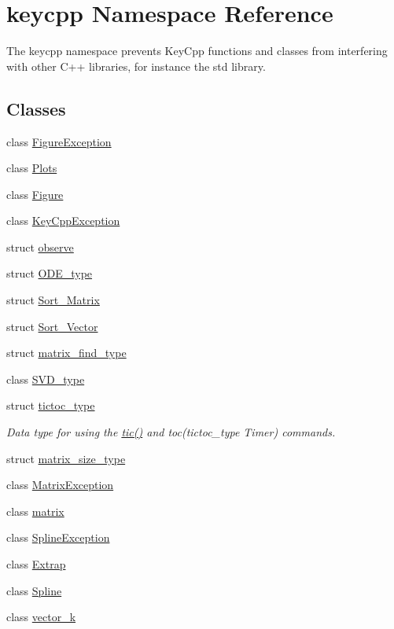 \hypertarget{namespacekeycpp}{\section{keycpp Namespace Reference}
\label{namespacekeycpp}
}


The keycpp namespace prevents Key\-Cpp functions and classes from interfering with other C++ libraries, for instance the std library.  


\subsection*{Classes}
\begin{DoxyCompactItemize}
\item 
class \hyperlink{classkeycpp_1_1_figure_exception}{Figure\-Exception}
\item 
class \hyperlink{classkeycpp_1_1_plots}{Plots}
\item 
class \hyperlink{classkeycpp_1_1_figure}{Figure}
\item 
class \hyperlink{classkeycpp_1_1_key_cpp_exception}{Key\-Cpp\-Exception}
\item 
struct \hyperlink{structkeycpp_1_1observe}{observe}
\item 
struct \hyperlink{structkeycpp_1_1_o_d_e__type}{O\-D\-E\-\_\-type}
\item 
struct \hyperlink{structkeycpp_1_1_sort___matrix}{Sort\-\_\-\-Matrix}
\item 
struct \hyperlink{structkeycpp_1_1_sort___vector}{Sort\-\_\-\-Vector}
\item 
struct \hyperlink{structkeycpp_1_1matrix__find__type}{matrix\-\_\-find\-\_\-type}
\item 
class \hyperlink{classkeycpp_1_1_s_v_d__type}{S\-V\-D\-\_\-type}
\item 
struct \hyperlink{structkeycpp_1_1tictoc__type}{tictoc\-\_\-type}
\begin{DoxyCompactList}\small\item\em Data type for using the \hyperlink{namespacekeycpp_a6069a9eec0edfa1d401230013d98765e}{tic()} and toc(tictoc\-\_\-type Timer) commands. \end{DoxyCompactList}\item 
struct \hyperlink{structkeycpp_1_1matrix__size__type}{matrix\-\_\-size\-\_\-type}
\item 
class \hyperlink{classkeycpp_1_1_matrix_exception}{Matrix\-Exception}
\item 
class \hyperlink{classkeycpp_1_1matrix}{matrix}
\item 
class \hyperlink{classkeycpp_1_1_spline_exception}{Spline\-Exception}
\item 
class \hyperlink{classkeycpp_1_1_extrap}{Extrap}
\item 
class \hyperlink{classkeycpp_1_1_spline}{Spline}
\item 
class \hyperlink{classkeycpp_1_1vector__k}{vector\-\_\-k}
\end{DoxyCompactItemize}
